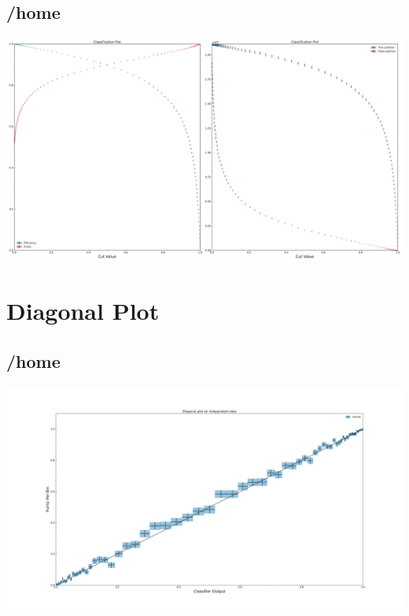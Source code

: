 \documentclass[10pt,a4paper]{article}
\begin{document}
\subsection{/home}
\begin{center}
\includegraphics[width=1\textwidth]{classification_result_-936217630058450507.pdf}
\end{center}
\raggedbottom
\pagebreak[0]
\FloatBarrier
\section{Diagonal Plot}
\subsection{/home}
\begin{center}
\includegraphics[width=1.0\textwidth]{diagonal_plot_test.pdf}
\end{center}
\end{document}
